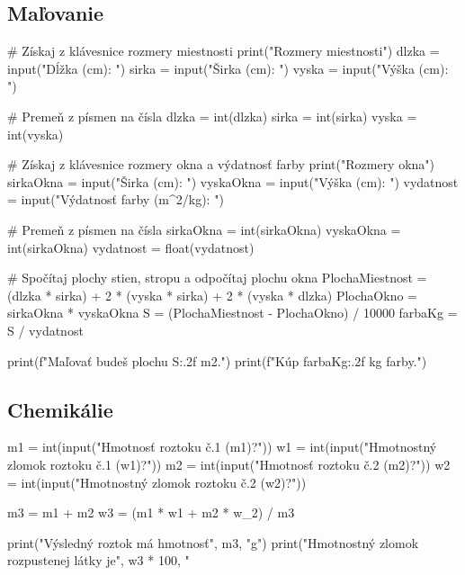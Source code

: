 \subsection{Maľovanie}
\begin{solution}
# Získaj z klávesnice rozmery miestnosti
print("Rozmery miestnosti")
dlzka = input("Dĺžka (cm): ")
sirka = input("Širka (cm): ")
vyska = input("Výška (cm): ")

# Premeň z písmen na čísla
dlzka = int(dlzka)
sirka = int(sirka)
vyska = int(vyska)

# Získaj z klávesnice rozmery okna a výdatnosť farby
print("Rozmery okna")
sirkaOkna = input("Širka (cm): ")
vyskaOkna = input("Výška (cm): ")
vydatnost = input("Výdatnosť farby (m^2/kg): ")

# Premeň z písmen na čísla
sirkaOkna = int(sirkaOkna)
vyskaOkna = int(sirkaOkna)
vydatnost = float(vydatnost)

# Spočítaj plochy stien, stropu a odpočítaj plochu okna
PlochaMiestnost = (dlzka * sirka) + 2 * (vyska * sirka) + 2 * (vyska * dlzka)
PlochaOkno = sirkaOkna * vyskaOkna
S = (PlochaMiestnost - PlochaOkno) / 10000
farbaKg = S / vydatnost

print(f"Maľovať budeš plochu {S:.2f} m2.")
print(f"Kúp {farbaKg:.2f} kg farby.")
\end{solution}

\subsection{Chemikálie}
\begin{solution}
m1 = int(input("Hmotnosť roztoku č.1 (m1)?"))
w1 = int(input("Hmotnostný zlomok roztoku č.1 (w1)?"))
m2 = int(input("Hmotnosť roztoku č.2 (m2)?"))
w2 = int(input("Hmotnostný zlomok roztoku č.2 (w2)?"))

m3 = m1 + m2
w3 = (m1 * w1 + m2 * w_2) / m3

print("Výsledný roztok má hmotnosť", m3, "g")
print("Hmotnostný zlomok rozpustenej látky je", w3 * 100, "%
\end{solution}

